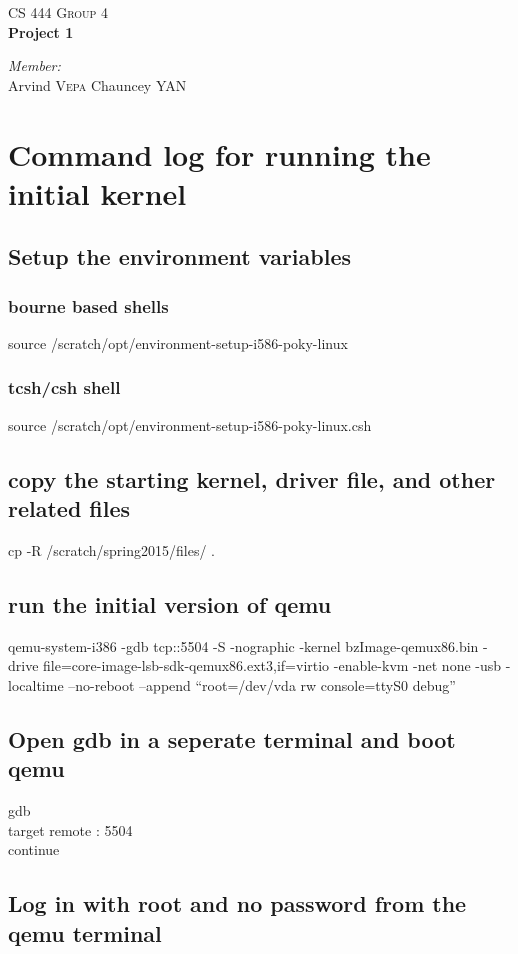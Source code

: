 \documentclass[letterpaper,10pt]{article}
\begin{document}

\begin{center}
\textsc{\LARGE CS 444 Group 4}\\

{ \huge \bfseries Project 1 \\}

\emph{Member:}\\
Arvind \textsc{Vepa}
Chauncey \textsc{YAN}
\end{center}


\section{Command log for running the initial kernel}
\subsection{Setup the environment variables}
\subsubsection{bourne based shells}
source /scratch/opt/environment-setup-i586-poky-linux
\subsubsection{tcsh/csh shell}
source /scratch/opt/environment-setup-i586-poky-linux.csh
\subsection{copy the starting kernel, driver file, and other related files}
cp -R /scratch/spring2015/files/ .
\subsection{run the initial version of qemu}
qemu-system-i386 -gdb tcp::5504 -S -nographic -kernel bzImage-qemux86.bin -drive file=core-image-lsb-sdk-qemux86.ext3,if=virtio -enable-kvm -net none -usb -localtime --no-reboot --append ``root=/dev/vda rw console=ttyS0 debug''
\subsection{Open gdb in a seperate terminal and boot qemu}
gdb\\
target remote : 5504\\
continue\\
\subsection{Log in with root and no password from the qemu terminal}
\end{document}
